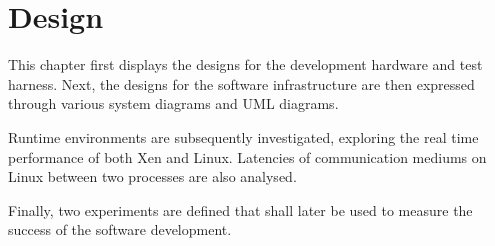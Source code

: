 \chapter{Design}









This chapter first displays the designs for the development hardware and test harness. Next, the designs for the software infrastructure are then expressed through various system diagrams and UML diagrams.

Runtime environments are subsequently investigated, exploring the real time performance of both Xen and Linux. Latencies of communication mediums on Linux between two processes are also analysed.

Finally, two experiments are defined that shall later be used to measure the success of the software development.


\clearpage


\clearpage


\clearpage


\clearpage


\clearpage

